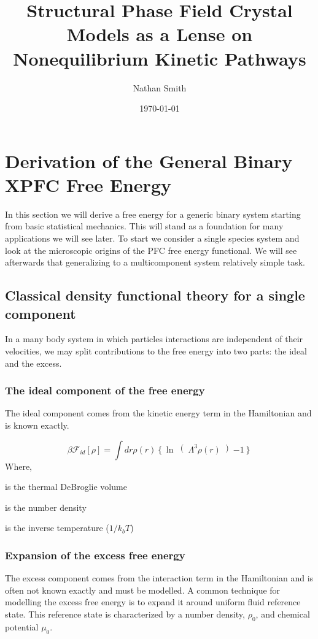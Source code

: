 \documentclass[11pt]{article}
\title{Structural Phase Field Crystal Models as a Lense on Nonequilibrium Kinetic Pathways}
\author{Nathan Smith}
\date{\today}
\newcommand{\F}{\mathcal{F}}
\renewcommand{\l}{\left}
\renewcommand{\r}{\right}
\begin{document}
\maketitle
\tableofcontents

\section{Derivation of the General Binary XPFC Free Energy}

In this section we will derive a free energy for a generic binary system starting from basic statistical mechanics.
This will stand as a foundation for many applications we will see later.
To start we consider a single species system and look at the microscopic origins of the PFC free energy functional.
We will see afterwards that generalizing to a multicomponent system relatively simple task.

\subsection{Classical density functional theory for a single component}

In a many body system in which particles interactions are independent of their velocities, we may split contributions to the free energy into two parts: the ideal and the excess.

\subsubsection{The ideal component of the free energy}
The ideal component comes from the kinetic energy term in the Hamiltonian and is known exactly.

\begin{equation}
    \beta\F_{id}[\rho] = \int dr \rho(r) \l\lbrace\ln\right(\Lambda^3\rho(r)\left) - 1\r\rbrace
\end{equation}
Where,
\begin{description}[labelindent=10pt, labelsep=10pt]
\item[$\Lambda^3$] is the thermal DeBroglie volume
\item[$\rho(r)$] is the number density
\item[$\beta$] is the inverse temperature ($1/k_bT$)
\end{description}

\subsubsection{Expansion of the excess free energy}
The excess component comes from the interaction term in the Hamiltonian and is often not known exactly and must be modelled.
A common technique for modelling the excess free energy is to expand it around uniform fluid reference state.
This reference state is characterized by a number density, $\rho_0$, and chemical potential $\mu_0$.
\end{document}
